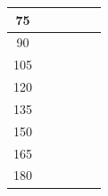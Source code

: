 \begin{table}[htbp]
\begin{center}
\begin{tabular}{|p{20mm}|p{20mm}|p{20mm}|p{20mm}|p{20mm}|p{20mm}|}
            \multicolumn{1}{|c|}{75}                      & \multicolumn{1}{|r|}{}                        & \multicolumn{1}{|r|}{}                   & \multicolumn{1}{|r|}{}                    & \multicolumn{1}{|r|}{}                   & \multicolumn{1}{|r|}{}                         \\ \hline
            \multicolumn{1}{|c|}{90}                      & \multicolumn{1}{|r|}{}                        & \multicolumn{1}{|r|}{}                   & \multicolumn{1}{|r|}{}                    & \multicolumn{1}{|r|}{}                   & \multicolumn{1}{|r|}{}                         \\ \hline
            \multicolumn{1}{|c|}{105}                     & \multicolumn{1}{|r|}{}                        & \multicolumn{1}{|r|}{}                   & \multicolumn{1}{|r|}{}                    & \multicolumn{1}{|r|}{}                   & \multicolumn{1}{|r|}{}                         \\ \hline
            \multicolumn{1}{|c|}{120}                     & \multicolumn{1}{|r|}{}                        & \multicolumn{1}{|r|}{}                   & \multicolumn{1}{|r|}{}                    & \multicolumn{1}{|r|}{}                   & \multicolumn{1}{|r|}{}                         \\ \hline
            \multicolumn{1}{|c|}{135}                     & \multicolumn{1}{|r|}{}                        & \multicolumn{1}{|r|}{}                   & \multicolumn{1}{|r|}{}                    & \multicolumn{1}{|r|}{}                   & \multicolumn{1}{|r|}{}                         \\ \hline
            \multicolumn{1}{|c|}{150}                     & \multicolumn{1}{|r|}{}                        & \multicolumn{1}{|r|}{}                   & \multicolumn{1}{|r|}{}                    & \multicolumn{1}{|r|}{}                   & \multicolumn{1}{|r|}{}                         \\ \hline
            \multicolumn{1}{|c|}{165}                     & \multicolumn{1}{|r|}{}                        & \multicolumn{1}{|r|}{}                   & \multicolumn{1}{|r|}{}                    & \multicolumn{1}{|r|}{}                   & \multicolumn{1}{|r|}{}                         \\ \hline
            \multicolumn{1}{|c|}{180}                     & \multicolumn{1}{|r|}{}                        & \multicolumn{1}{|r|}{}                   & \multicolumn{1}{|r|}{}                    & \multicolumn{1}{|r|}{}                   & \multicolumn{1}{|r|}{}                         \\ \hline

\end{tabular}
\end{center}
\end{table}
